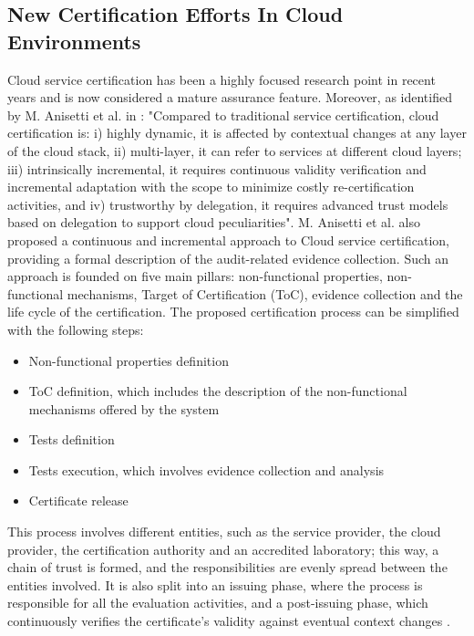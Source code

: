 \subsection{New Certification Efforts In Cloud Environments}
Cloud service certification has been a highly focused research point in recent years and is now considered a mature assurance feature. Moreover, as identified by M. Anisetti et al. in \cite{anisetti2017semi}: "Compared to traditional service certification, cloud certification is: i) highly dynamic, it is affected by contextual changes at any layer of the cloud stack, ii) multi-layer, it can refer to services at different cloud layers; iii) intrinsically incremental, it requires continuous validity verification and incremental adaptation with the scope to minimize costly re-certification activities, and iv) trustworthy by delegation, it requires advanced trust models based on delegation to support cloud peculiarities". M. Anisetti et al. also proposed a continuous and incremental approach to Cloud service certification, providing a formal description of the audit-related evidence collection. Such an approach is founded on five main pillars: non-functional properties, non-functional mechanisms, Target of Certification (ToC), evidence collection and the life cycle of the certification. The proposed certification process can be simplified with the following steps:

\begin{itemize}
    \item Non-functional properties definition
    \item ToC definition, which includes the description of the non-functional mechanisms offered by the system
    \item Tests definition
    \item Tests execution, which involves evidence collection and analysis
    \item Certificate release
\end{itemize}

This process involves different entities, such as the service provider, the cloud provider, the certification authority and an accredited laboratory; this way, a chain of trust is formed, and the responsibilities are evenly spread between the entities involved. It is also split into an issuing phase, where the process is responsible for all the evaluation activities, and a post-issuing phase, which continuously verifies the certificate's validity against eventual context changes \cite{anisetti2017semi}.

